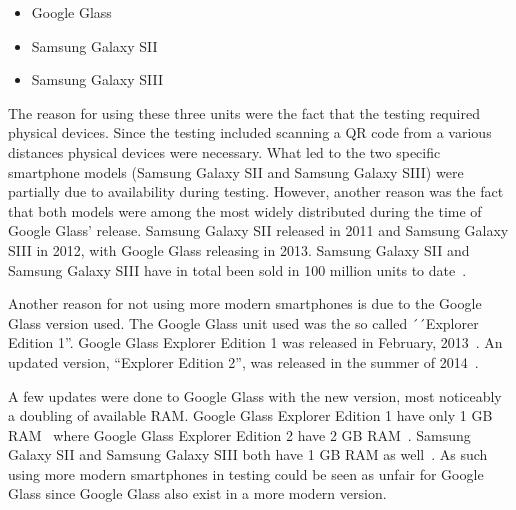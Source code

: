 \begin{itemize}
	\item Google Glass
	\item Samsung Galaxy SII~\cite{samsungGalaxyS2Wiki}
	\item Samsung Galaxy SIII~\cite{samsungGalaxyS3Wiki}
\end{itemize}

The reason for using these three units were the fact that the testing required physical devices. Since the testing included scanning a QR code from a various distances physical devices were necessary. What led to the two specific smartphone models (Samsung Galaxy SII and Samsung Galaxy SIII) were partially due to availability during testing. However, another reason was the fact that both models were among the most widely distributed during the time of Google Glass' release. Samsung Galaxy SII released in 2011 and Samsung Galaxy SIII in 2012, with Google Glass releasing in 2013. Samsung Galaxy SII and Samsung Galaxy SIII have in total been sold in 100 million units to date~\cite{samsungGalaxyS2Sales, samsungGalaxyS3Sales}.

Another reason for not using more modern smartphones is due to the Google Glass version used. The Google Glass unit used was the so called ´´Explorer Edition 1''. Google Glass Explorer Edition 1 was released in February, 2013~\cite{historyOfGlass}. An updated version, ``Explorer Edition 2'', was released in the summer of 2014~\cite{googleGlassEdition2RAM}. 

A few updates were done to Google Glass with the new version, most noticeably a doubling of available RAM. Google Glass Explorer Edition 1 have only 1 GB RAM~\cite{googleGlassEdition1RAM} where Google Glass Explorer Edition 2 have 2 GB RAM~\cite{googleGlassEdition2RAM}. Samsung Galaxy SII and Samsung Galaxy SIII both have 1 GB RAM as well~\cite{samsungGalaxyS2Wiki, samsungGalaxyS3Wiki}. As such using more modern smartphones in testing could be seen as unfair for Google Glass since Google Glass also exist in a more modern version.